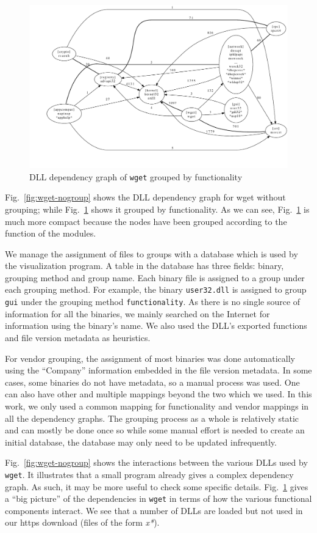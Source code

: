 \begin{figure}[thb]
\centering
\includegraphics[width=1.0\columnwidth]{depvis/wget-function.pdf}
\caption{DLL dependency graph of {\tt wget} grouped by functionality}
\label{fig:wget-function}
\end{figure}

Fig.~\ref{fig:wget-nogroup} shows the DLL
dependency graph for wget without grouping; while
Fig.~\ref{fig:wget-function} shows it grouped by functionality.
As we can see, Fig.~\ref{fig:wget-function} is much more compact
because the nodes have been grouped according to the function of the modules.

We manage the assignment of files to groups with a data\-base which is
used by the visualization program.
A table in the database has three fields: binary,
grouping method and group name.
Each binary file is assigned to a group under each grouping method.
For example, the binary {\tt user32.dll} is assigned to group {\tt gui} under
the grouping method {\tt functi\-onality}.
As there is no single source of information for all the binaries, we mainly
searched on the Internet for information using the binary's name.
We also used the DLL's exported functions and file version metadata
as heuristics.

For vendor grouping, the assignment of most binaries was done automatically
using the ``Company'' information embedded in the file version metadata.
In some cases, some binaries do not have metadata, so a manual process
was used.
One can also have other and multiple mappings beyond the two which we used.
In this work, we only used a
common mapping for functionality and vendor mappings
in all the dependency graphs.
The grouping process as a whole is relatively static and can mostly be
done once so while some manual effort is needed to create an initial
database, the database may only need to be updated infrequently.

Fig.~\ref{fig:wget-nogroup} shows the interactions
between the various DLLs used by {\tt wget}.
It illustrates that a small program already
gives a complex dependency graph.
As such, it may be more useful to check some specific details.
Fig.~\ref{fig:wget-function} gives
a ``big picture'' of the dependencies
in {\tt wget} in terms of how the various functional
components interact.
We see that a number of DLLs are loaded but not used in our https download
(files of the form {\it *x*}).

